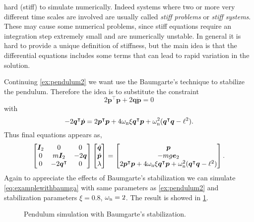hard (stiff) to simulate numerically.
Indeed systems where two or more very different time scales are involved are
usually called \emph{stiff problems} or \emph{stiff systems}.
These may cause some numerical problems, since stiff equations require
an integration step extremely small and are numerically unstable.
In general it is hard to provide a unique definition of stiffness,
but the main idea is that the differential equations includes some
terms that can lead to rapid variation in the solution.
\begin{example}
	Continuing \cref{ex:pendulum2} we want use the Baumgarte's
	technique to stabilize the pendulum. Therefore the idea is to substitute the constraint
	\begin{equation*}
		2\bm{p}^{\intercal}\bm{p}+2\bm{q}\dot{\bm{p}} = 0
	\end{equation*}
	with
	\begin{equation*}
		-2\bm{q}^{\intercal}\dot{\bm{p}} = 2\bm{p}^{\intercal}\bm{p}
		+ 4\omega_{\textnormal{n}}\xi\bm{q}^{\intercal}\bm{p}
		+ \omega_{\textnormal{n}}^{2}(\bm{q}^{\intercal}\bm{q}-\ell^{2}).
	\end{equation*}
	Thus final equations appears as, 
	\begin{equation}
		\label{eq:examplewithbaumga}
		\begin{bmatrix}
			\bm{I}_{2} 	& 0 & 0 \\
			0 			& m\bm{I}_{2} & -2\bm{q} \\ 
			0 			& -2\bm{q}^{\intercal}  & 0
		\end{bmatrix}
		\begin{bmatrix}
			\dot{\bm{q}} \\
			\dot{\bm{p}} \\
			\lambda
		\end{bmatrix}
		= 
		\begin{bmatrix}
			\bm{p} \\
			-mg\bm{e}_{2}\\
			2\bm{p}^{\intercal}\bm{p} + 4\omega_{\textnormal{n}}\xi\bm{q}^{\intercal}\bm{p} 
			+ \omega_{\textnormal{n}}^{2}(\bm{q}^{\intercal}\bm{q}-\ell^{2})
		\end{bmatrix}.
	\end{equation}
	Again to appreciate the effects of Baumgarte's stabilization we can simulate
	\cref{eq:examplewithbaumga} with same parameters as \cref{ex:pendulum2}
	and stabilization parameters $\xi = 0.8$,
	$\omega_{\textnormal{n}} = 2$.
	The result is showed in \cref{fig:trackingerros}.
	\begin{figure}[htbp]
		\centering
		\caption{Pendulum simulation with Baumgarte's stabilization.}
		\label{fig:trackingerros}
	\end{figure}
\end{example}

\endinput
		
		
